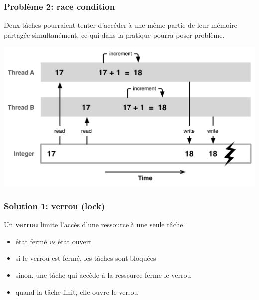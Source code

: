 \documentclass{beamer}
\begin{document}
\begin{frame} 
  \frametitle{Problème 2: \textbf{race condition}}
  \begin{minipage}{.48\textwidth}
    Deux tâches pourraient tenter d'accéder à une même partie
    de leur mémoire partagée simultanément, ce qui dans la pratique
    pourra poser problème.
  \end{minipage}
  \quad
  \begin{minipage}{.45\textwidth}
    \begin{center}
      \includegraphics[width=.7\textwidth]{race-condition.png}      
    \end{center}
  \end{minipage}
\end{frame} %
\begin{frame}
  \frametitle{Solution 1: \textbf{verrou} (lock)}
  Un \textbf{verrou} limite l'accès d'une ressource à une seule tâche.
  \begin{itemize}
  \item état fermé \textit{vs} état ouvert
  \item si le verrou est fermé, les tâches sont bloquées
  \item sinon, une tâche qui accède à la ressource ferme le verrou
  \item quand la tâche finit, elle ouvre le verrou
  \end{itemize}
\end{frame} %
\end{document}
